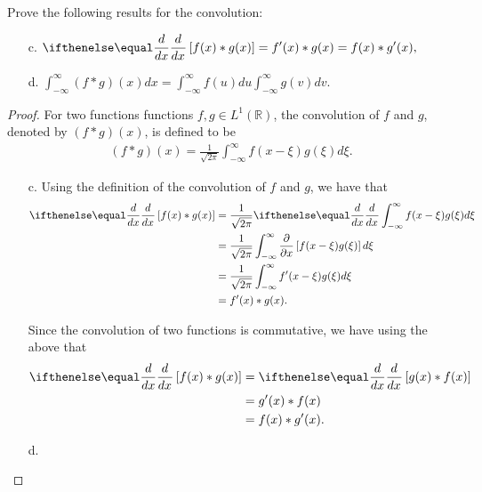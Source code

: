 \begin{problem}{2.7}
  Prove the following results for the convolution:
  \begin{enumerate}
    \item [c.] $\displaystyle \der{x}{}\left[f(x) \ast g(x)\right] = f'(x) \ast g(x) = f(x) \ast g'(x),$
    \item [d.] $\displaystyle \int_{-\infty}^{\infty} (f \ast g)(x) dx = \int_{-\infty}^{\infty} f(u)du \int_{-\infty}^{\infty} g(v)dv.$
  \end{enumerate}
\end{problem}

\begin{proof}
  For two functions functions $f, g \in L^1(\mathbb{R})$, the convolution of $f$ and $g$,
  denoted by $(f \ast g )(x)$, is defined to be
  \begin{align*}
    (f \ast g )(x) = \frac{1}{\sqrt{2\pi}} \int_{-\infty}^{\infty} f(x - \xi) g(\xi) d\xi.
  \end{align*}
  \begin{enumerate}
    \item [c.] Using the definition of the convolution of $f$ and $g$, we have that
      \begin{align*}
        \der{x}{}\left[f(x) \ast g(x)\right] &= \frac{1}{\sqrt{2\pi}}\der{x}{}\int_{-\infty}^{\infty} f(x - \xi) g(\xi) d\xi \\
        &= \frac{1}{\sqrt{2\pi}}\int_{-\infty}^{\infty} \frac{\partial}{\partial x}\left[f(x - \xi) g(\xi)\right] d\xi \\
        &= \frac{1}{\sqrt{2\pi}}\int_{-\infty}^{\infty} f'(x - \xi) g(\xi)d\xi \\
        &= f'(x) \ast g(x).
      \end{align*}

      Since the convolution of two functions is commutative, we have using the above that
      \begin{align*}
        \der{x}{}\left[f(x) \ast g(x)\right] &= \der{x}{}\left[g(x) \ast f(x)\right] \\
        &= g'(x) \ast f(x) \\
        &= f(x) \ast g'(x).
      \end{align*}
    \item [d.]
  \end{enumerate}
\end{proof}
\newpage
